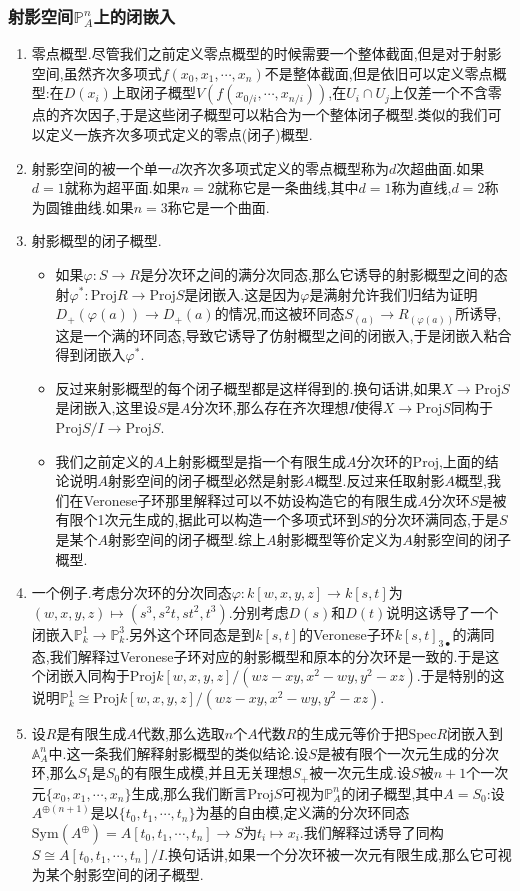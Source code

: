 \subsubsection{射影空间$\mathbb{P}_A^n$上的闭嵌入}
\begin{enumerate}
	\item 零点概型.尽管我们之前定义零点概型的时候需要一个整体截面,但是对于射影空间,虽然齐次多项式$f(x_0,x_1,\cdots,x_n)$不是整体截面,但是依旧可以定义零点概型:在$D(x_i)$上取闭子概型$V(f(x_{0/i},\cdots,x_{n/i}))$,在$U_i\cap U_j$上仅差一个不含零点的齐次因子,于是这些闭子概型可以粘合为一个整体闭子概型.类似的我们可以定义一族齐次多项式定义的零点(闭子)概型.
	\item 射影空间的被一个单一$d$次齐次多项式定义的零点概型称为$d$次超曲面.如果$d=1$就称为超平面.如果$n=2$就称它是一条曲线,其中$d=1$称为直线,$d=2$称为圆锥曲线.如果$n=3$称它是一个曲面.
	\item 射影概型的闭子概型.
	\begin{itemize}
		\item 如果$\varphi:S\to R$是分次环之间的满分次同态,那么它诱导的射影概型之间的态射$\varphi^*:\mathrm{Proj}R\to\mathrm{Proj}S$是闭嵌入.这是因为$\varphi$是满射允许我们归结为证明$D_+(\varphi(a))\to D_+(a)$的情况,而这被环同态$S_{(a)}\to R_{(\varphi(a))}$所诱导,这是一个满的环同态,导致它诱导了仿射概型之间的闭嵌入,于是闭嵌入粘合得到闭嵌入$\varphi^*$.
		\item 反过来射影概型的每个闭子概型都是这样得到的.换句话讲,如果$X\to\mathrm{Proj}S$是闭嵌入,这里设$S$是$A$分次环,那么存在齐次理想$I$使得$X\to\mathrm{Proj}S$同构于$\mathrm{Proj}S/I\to\mathrm{Proj}S$.
		\item 我们之前定义的$A$上射影概型是指一个有限生成$A$分次环的$\mathrm{Proj}$,上面的结论说明$A$射影空间的闭子概型必然是射影$A$概型.反过来任取射影$A$概型,我们在Veronese子环那里解释过可以不妨设构造它的有限生成$A$分次环$S$是被有限个1次元生成的,据此可以构造一个多项式环到$S$的分次环满同态,于是$S$是某个$A$射影空间的闭子概型.综上$A$射影概型等价定义为$A$射影空间的闭子概型.
	\end{itemize}
	\item 一个例子.考虑分次环的分次同态$\varphi:k[w,x,y,z]\to k[s,t]$为$(w,x,y,z)\mapsto(s^3,s^2t,st^2,t^3)$.分别考虑$D(s)$和$D(t)$说明这诱导了一个闭嵌入$\mathbb{P}^1_k\to\mathbb{P}^3_k$.另外这个环同态是到$k[s,t]$的Veronese子环$k[s,t]_{3\bullet}$的满同态,我们解释过Veronese子环对应的射影概型和原本的分次环是一致的.于是这个闭嵌入同构于$\mathrm{Proj}k[w,x,y,z]/(wz-xy,x^2-wy,y^2-xz)$.于是特别的这说明$\mathbb{P}^1_k\cong\mathrm{Proj}k[w,x,y,z]/(wz-xy,x^2-wy,y^2-xz)$.
	\item 设$R$是有限生成$A$代数,那么选取$n$个$A$代数$R$的生成元等价于把$\mathrm{Spec}R$闭嵌入到$\mathbb{A}_A^n$中.这一条我们解释射影概型的类似结论.设$S$是被有限个一次元生成的分次环,那么$S_1$是$S_0$的有限生成模,并且无关理想$S_+$被一次元生成.设$S$被$n+1$个一次元$\{x_0,x_1,\cdots,x_n\}$生成,那么我们断言$\mathrm{Proj}S$可视为$\mathbb{P}^n_A$的闭子概型,其中$A=S_0$:设$A^{\oplus(n+1)}$是以$\{t_0,t_1,\cdots,t_n\}$为基的自由模,定义满的分次环同态$\mathrm{Sym}(A^{\oplus})=A[t_0,t_1,\cdots,t_n]\to S$为$t_i\mapsto x_i$.我们解释过诱导了同构$S\cong A[t_0,t_1,\cdots,t_n]/I$.换句话讲,如果一个分次环被一次元有限生成,那么它可视为某个射影空间的闭子概型.

\end{enumerate}

